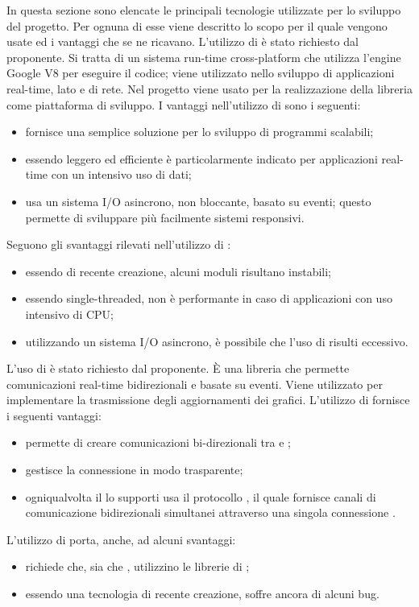 In questa sezione sono elencate le principali tecnologie utilizzate per lo sviluppo del progetto. Per ognuna di esse viene descritto lo scopo per il quale vengono usate ed i vantaggi che se ne ricavano.
L'utilizzo di  è stato richiesto dal proponente. Si tratta di un sistema run-time cross-platform che utilizza l'engine Google V8  per eseguire il codice; viene utilizzato nello sviluppo di applicazioni real-time, lato  e di rete. Nel progetto viene usato per la realizzazione della libreria come piattaforma di sviluppo.
I vantaggi nell'utilizzo di  sono i seguenti:
\begin{itemize}
\item fornisce una semplice soluzione per lo sviluppo di programmi scalabili;
\item essendo leggero ed efficiente è particolarmente indicato per applicazioni real-time con un intensivo uso di dati;
\item usa un sistema I/O asincrono, non bloccante, basato su eventi; questo permette di sviluppare più facilmente sistemi responsivi.
\end{itemize}
Seguono gli svantaggi rilevati nell'utilizzo di :
\begin{itemize}
	\item essendo di recente creazione, alcuni moduli risultano instabili;
	\item essendo single-threaded, non è performante in caso di applicazioni con uso intensivo di CPU;
	\item utilizzando un sistema I/O asincrono, è possibile che l'uso di  risulti eccessivo.
\end{itemize}

L'uso di  è stato richiesto dal proponente. È una libreria  che permette comunicazioni real-time bidirezionali e basate su eventi. Viene utilizzato per implementare la trasmissione degli aggiornamenti dei grafici.
L'utilizzo di  fornisce i seguenti vantaggi:
\begin{itemize}
\item permette di creare comunicazioni bi-direzionali tra  e ;
\item gestisce la connessione in modo trasparente;
\item ogniqualvolta il  lo supporti usa il protocollo , il quale fornisce canali di comunicazione bidirezionali simultanei attraverso una singola connessione .
\end{itemize}
L'utilizzo di  porta, anche, ad alcuni svantaggi:
\begin{itemize}
	\item richiede che, sia  che , utilizzino le librerie di ;
	\item essendo una tecnologia di recente creazione, soffre ancora di alcuni bug.
\end{itemize}

